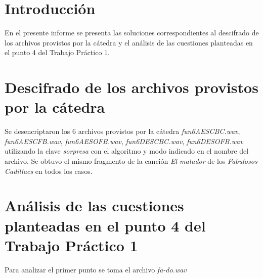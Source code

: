 \documentclass[a4paper,10pt]{article}
\author
{
	Pablo Giorgi,
	Santiago Perez De Rosso,
	Luciano Zemin
}
\date{Abril 2011}
\title{\articleTitle}
\begin{document}

\maketitle

\tableofcontents

\section{Introducción}

En el presente informe se presenta las soluciones correspondientes al descifrado
de los archivos provistos por la c\'atedra y el an\'alisis de las cuestiones
planteadas en el punto 4 del Trabajo Pr\'actico 1.

\section{Descifrado de los archivos provistos por la c\'atedra}

Se desencriptaron los 6 archivos provistos por la c\'atedra
\emph{fun6AESCBC.wav}, \emph{fun6AESCFB.wav}, \emph{fun6AESOFB.wav},
\emph{fun6DESCBC.wav}, \emph{fun6DESOFB.wav} utilizando la clave \emph{sorpresa}
con el algoritmo y modo indicado en el nombre del archivo. Se obtuvo
el mismo fragmento de la canción \emph{El matador} de los \emph{Fabulosos Cadillacs}
en todos los casos.

\section{An\'alisis de las cuestiones planteadas en el punto 4 del Trabajo Pr\'actico 1}

Para analizar el primer punto se toma el archivo \emph{fa-do.wav}
\end{document}
